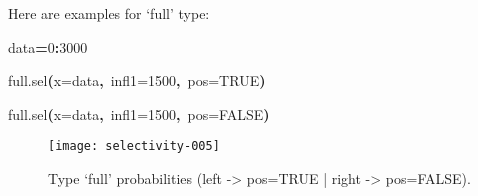 \documentclass[letterpaper, 12pt]{article}
\newenvironment{Hinput}%
{}%
{}%
\newenvironment{Hchunk}%
{\vspace{0.5em}\par\begin{flushleft}}%
{\end{flushleft}}%
\newcommand{\hlnumber}[1]{\textcolor[rgb]{0.0823529411764706,0.0784313725490196,0.709803921568627}{#1}}%
\newcommand{\hlfunctioncall}[1]{\textcolor[rgb]{1,0,0}{#1}}%
\newcommand{\hlkeyword}[1]{\textcolor[rgb]{0,0,0}{\textbf{#1}}}%
\newcommand{\hlargument}[1]{\textcolor[rgb]{0.694117647058824,0.247058823529412,0.0196078431372549}{#1}}%
\newcommand{\hlassignement}[1]{\textcolor[rgb]{0.215686274509804,0.215686274509804,0.384313725490196}{\textbf{#1}}}%
\newcommand{\hlsymbol}[1]{\textcolor[rgb]{0,0,0}{#1}}%
\newcommand{\hlprompt}[1]{\textcolor[rgb]{0,0,0}{#1}}%
\begin{document}
\newpage

Here are examples for `full' type:
\begin{Hchunk}
\begin{normalsize}
\begin{Hinput}
\ttfamily\noindent
\hlprompt{\usebox{\hlnormalsizeboxgreaterthan}{\ }}\hlsymbol{data}\hlassignement{=}\hlnumber{0}\hlkeyword{:}\hlnumber{3000}\mbox{}
\normalfont
\end{Hinput}


\begin{Hinput}
\ttfamily\noindent
\hlprompt{\usebox{\hlnormalsizeboxgreaterthan}{\ }}\hlfunctioncall{full.sel}\hlkeyword{(}\hlargument{x}\hlargument{=}\hlsymbol{data}\hlkeyword{,}{\ }\hlargument{infl1}\hlargument{=}\hlnumber{1500}\hlkeyword{,}{\ }\hlargument{pos}\hlargument{=}\hlnumber{TRUE}\hlkeyword{)}\mbox{}
\normalfont
\end{Hinput}


\begin{Hinput}
\ttfamily\noindent
\hlprompt{\usebox{\hlnormalsizeboxgreaterthan}{\ }}\hlfunctioncall{full.sel}\hlkeyword{(}\hlargument{x}\hlargument{=}\hlsymbol{data}\hlkeyword{,}{\ }\hlargument{infl1}\hlargument{=}\hlnumber{1500}\hlkeyword{,}{\ }\hlargument{pos}\hlargument{=}\hlnumber{FALSE}\hlkeyword{)}\mbox{}
\normalfont
\end{Hinput}


\end{normalsize}
\end{Hchunk}


\begin{figure}[h]
\vspace{-20pt}
\begin{center}
\texttt{[image: selectivity-005]}
\end{center}
\vspace{-30pt}
\caption{Type `full' probabilities (left -> pos=TRUE |  right -> pos=FALSE).}
\vspace{-10pt}
\label{fig2}
\end{figure}
\end{document}

